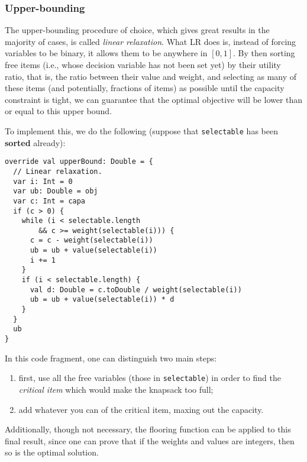 \documentclass[journal]{IEEEtran}
\newcommand{\scala}[1]{\texttt{#1}}
\begin{document}
\subsubsection{Upper-bounding}
The upper-bounding procedure of choice, which gives great results in the majority of cases, is called \emph{linear relaxation}.
What LR does is, instead of forcing variables to be binary, it allows them to be anywhere in \([0, 1]\).
By then sorting free items (i.e., whose decision variable has not been set yet) by their utility ratio, that is, the ratio between their value and weight, and selecting as many of these items (and potentially, fractions of items) as possible until the capacity constraint is tight, we can guarantee that the optimal objective will be lower than or equal to this upper bound.

To implement this, we do the following (suppose that \scala{selectable} has been \textbf{sorted} already):
\begin{verbatim}
override val upperBound: Double = {
  // Linear relaxation.
  var i: Int = 0
  var ub: Double = obj
  var c: Int = capa
  if (c > 0) {
    while (i < selectable.length
        && c >= weight(selectable(i))) {
      c = c - weight(selectable(i))
      ub = ub + value(selectable(i))
      i += 1
    }
    if (i < selectable.length) {
      val d: Double = c.toDouble / weight(selectable(i))
      ub = ub + value(selectable(i)) * d
    }
  }
  ub
}
\end{verbatim}
In this code fragment, one can distinguish two main steps:
\begin{enumerate}
	\item first, use all the free variables (those in \scala{selectable}) in order to find the \emph{critical item} which would make the knapsack too full;
	\item add whatever you can of the critical item, maxing out the capacity.
\end{enumerate}

Additionally, though not necessary, the flooring function can be applied to this final result, since one can prove that if the weights and values are integers, then so is the optimal solution.
\end{document}
